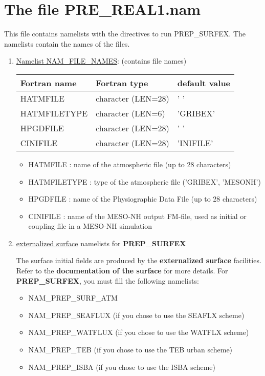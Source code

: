 \section{The file PRE\_REAL1.nam}
This file contains namelists with the directives to run PREP\_SURFEX.
The namelists contain the names of the files.
\begin{enumerate}

\item\underline{Namelist NAM\_FILE\_NAMES}: (contains file names)

\begin{center}
\begin{tabular} {|l|l|l|}
\hline
Fortran name & Fortran type & default value\\
\hline
\hline
HATMFILE      & character (LEN=28) & ' '           \\
HATMFILETYPE  & character (LEN=6)  & 'GRIBEX'      \\
HPGDFILE      & character (LEN=28) & ' '           \\
CINIFILE      & character (LEN=28) & 'INIFILE'     \\
\hline
\end{tabular}
\end{center}

\begin{itemize}
\item HATMFILE : name of the atmospheric file (up to 28 characters)
\item HATMFILETYPE : type of the atmospheric file ('GRIBEX', 'MESONH')
\item HPGDFILE : name of the Physiographic Data File (up to 28 characters)
\item CINIFILE : name of the MESO-NH output FM-file, used as initial
or coupling file in a MESO-NH simulation
\end{itemize}

\item\underline{ externalized surface} namelists for {\bf PREP\_SURFEX}

The surface initial fields are produced by the {\bf externalized surface} facilities.
Refer to the {\bf documentation of the surface} for more details.
For {\bf PREP\_SURFEX}, you must fill the following namelists:

\begin{itemize}
\item NAM\_PREP\_SURF\_ATM
\item NAM\_PREP\_SEAFLUX (if you chose to use the SEAFLX scheme)
\item NAM\_PREP\_WATFLUX (if you chose to use the WATFLX scheme)
\item NAM\_PREP\_TEB (if you chose to use the TEB urban scheme)
\item NAM\_PREP\_ISBA (if you chose to use the ISBA scheme)
\end{itemize}


\end{enumerate}
